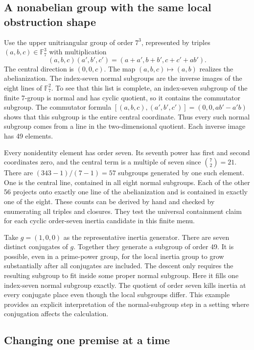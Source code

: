 \documentclass[12pt,letterpaper]{article}
\begin{document}
\subsection{A nonabelian group with the same local obstruction shape}

Use the upper unitriangular group of order \(7^3\), represented by triples \((a,b,c)\in\mathbb F_7^3\) with multiplication
\[
   (a,b,c)(a',b',c')=(a+a', b+b', c+c'+ab').
\]
The central direction is \((0,0,c)\). The map \((a,b,c)\mapsto(a,b)\) realizes the abelianization. The index-seven normal subgroups are the inverse images of the eight lines of \(\mathbb F_7^2\). To see that this list is complete, an index-seven subgroup of the finite 7-group is normal and has cyclic quotient, so it contains the commutator subgroup. The commutator formula \([(a,b,c),(a',b',c')]=(0,0,ab'-a'b)\) shows that this subgroup is the entire central coordinate. Thus every such normal subgroup comes from a line in the two-dimensional quotient. Each inverse image has 49 elements.

Every nonidentity element has order seven. Its seventh power has first and second coordinates zero, and the central term is a multiple of seven since \(\binom72=21\). There are \((343-1)/(7-1)=57\) subgroups generated by one such element. One is the central line, contained in all eight normal subgroups. Each of the other 56 projects onto exactly one line of the abelianization and is contained in exactly one of the eight. These counts can be derived by hand and checked by enumerating all triples and closures. They test the universal containment claim for each cyclic order-seven inertia candidate in this finite menu.

Take \(g=(1,0,0)\) as the representative inertia generator. There are seven distinct conjugates of \(g\). Together they generate a subgroup of order 49. It is possible, even in a prime-power group, for the local inertia group to grow substantially after all conjugates are included. The descent only requires the resulting subgroup to fit inside some proper normal subgroup. Here it fills one index-seven normal subgroup exactly. The quotient of order seven kills inertia at every conjugate place even though the local subgroups differ. This example provides an explicit interpretation of the normal-subgroup step in a setting where conjugation affects the calculation.

\subsection{Changing one premise at a time}
\end{document}
